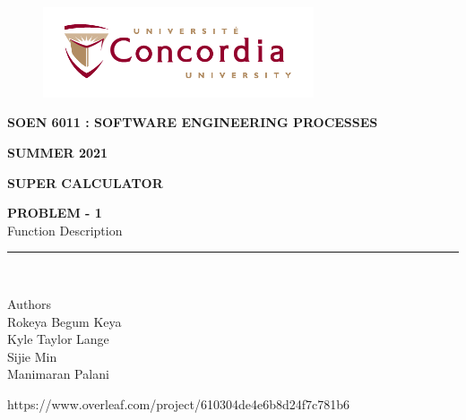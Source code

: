 \documentclass[letterpaper, 11pt]{report}
\begin{document}
\begin{titlepage}
\vspace*{0.7in}
\begin{center}
\begin{figure}[htb]
\begin{center}
\includegraphics[width=8cm]{univ_logo}
\end{center}
\end{figure}
\vspace*{0.3in}
\begin{Large}
\textbf{SOEN 6011 : SOFTWARE ENGINEERING PROCESSES} \\
\end{Large}
\vspace*{0.1in}
\begin{Large}
\textbf{SUMMER 2021} \\
\end{Large}
\vspace*{0.9in}
\begin{Large}
\textbf{SUPER CALCULATOR} \\
\end{Large}
\vspace*{0.9in}
\begin{Large}
\textbf{PROBLEM - 1} \\
Function Description \\
\end{Large}
\vspace*{0.625in}
\rule{80mm}{0.1mm}\\
\vspace*{0.1in}
\begin{large}
Authors \\
\vspace*{0.1in}
Rokeya Begum Keya\\
\vspace*{0.1in}
Kyle Taylor Lange\\
\vspace*{0.1in}
Sijie Min\\
\vspace*{0.1in}
Manimaran Palani\\ 
\vspace*{0.3in}
\date{\normalsize\today} 
\end{large}
\end{center}
\begin{center}
https://www.overleaf.com/project/610304de4e6b8d24f7c781b6\end{center}
\end{titlepage}
\tableofcontents
\newpage
{}
\end{document}
